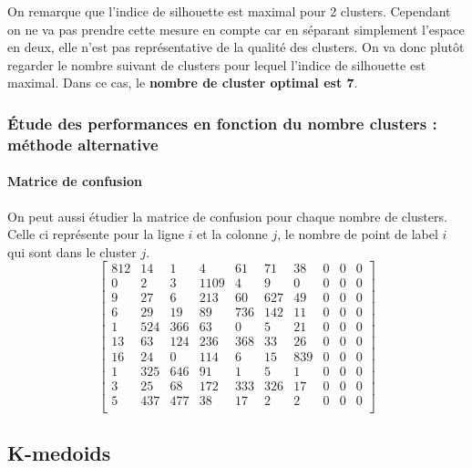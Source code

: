 \documentclass[french,a4paper,18pt]{article}
\begin{document}
On remarque que l'indice de silhouette est maximal pour 2 clusters. 
Cependant on ne va pas prendre cette mesure en compte car en séparant simplement l'espace en deux, 
elle n'est pas représentative de la qualité des clusters. 
On va donc plutôt regarder le nombre suivant de clusters pour lequel l'indice de silhouette est maximal. 
Dans ce cas, le \textbf{nombre de cluster optimal est 7}.

\subsubsection{Étude des performances en fonction du nombre clusters : méthode alternative}

\paragraph{Matrice de confusion}
On peut aussi étudier la matrice de confusion pour chaque nombre de clusters.
Celle ci représente pour la ligne $i$ et la colonne $j$, le nombre de point de label $i$ qui sont dans le cluster $j$.
\[
\begin{bmatrix}
  812 & 14 & 1 & 4 & 61 & 71 & 38 & 0 & 0 & 0 \\
  0 & 2 & 3 & 1109 & 4 & 9 & 0 & 0 & 0 & 0 \\
  9 & 27 & 6 & 213 & 60 & 627 & 49 & 0 & 0 & 0 \\
  6 & 29 & 19 & 89 & 736 & 142 & 11 & 0 & 0 & 0 \\
  1 & 524 & 366 & 63 & 0 & 5 & 21 & 0 & 0 & 0 \\
  13 & 63 & 124 & 236 & 368 & 33 & 26 & 0 & 0 & 0 \\
  16 & 24 & 0 & 114 & 6 & 15 & 839 & 0 & 0 & 0 \\
  1 & 325 & 646 & 91 & 1 & 5 & 1 & 0 & 0 & 0 \\
  3 & 25 & 68 & 172 & 333 & 326 & 17 & 0 & 0 & 0 \\
  5 & 437 & 477 & 38 & 17 & 2 & 2 & 0 & 0 & 0 \\
\end{bmatrix}
\]




\subsection{K-medoids}
\end{document}
